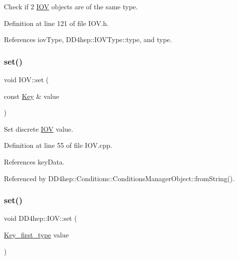 Check if 2 \hyperlink{class_d_d4hep_1_1_i_o_v}{I\+OV} objects are of the same type. 



Definition at line 121 of file I\+O\+V.\+h.



References iov\+Type, D\+D4hep\+::\+I\+O\+V\+Type\+::type, and type.

\hypertarget{class_d_d4hep_1_1_i_o_v_aa75452d30ebad70f84372091d6f777e4}{}\label{class_d_d4hep_1_1_i_o_v_aa75452d30ebad70f84372091d6f777e4} 
\subsubsection{\texorpdfstring{set()}{set()}\hspace{0.1cm}{\footnotesize\ttfamily [1/3]}}
{\footnotesize\ttfamily void I\+O\+V\+::set (\begin{DoxyParamCaption}\item[{const \hyperlink{class_d_d4hep_1_1_i_o_v_a07cb46dc875296dc9cccf4ff370104ae}{Key} \&}]{value }\end{DoxyParamCaption})}



Set discrete \hyperlink{class_d_d4hep_1_1_i_o_v}{I\+OV} value. 



Definition at line 55 of file I\+O\+V.\+cpp.



References key\+Data.



Referenced by D\+D4hep\+::\+Conditions\+::\+Conditions\+Manager\+Object\+::from\+String().

\hypertarget{class_d_d4hep_1_1_i_o_v_a8c9578e074d7c685fd7d1454b6b35d40}{}\label{class_d_d4hep_1_1_i_o_v_a8c9578e074d7c685fd7d1454b6b35d40} 
\subsubsection{\texorpdfstring{set()}{set()}\hspace{0.1cm}{\footnotesize\ttfamily [2/3]}}
{\footnotesize\ttfamily void D\+D4hep\+::\+I\+O\+V\+::set (\begin{DoxyParamCaption}\item[{\hyperlink{class_d_d4hep_1_1_i_o_v_a3f518f6b507c82c4ee614e52b3519325}{Key\+\_\+first\+\_\+type}}]{value }\end{DoxyParamCaption})}



